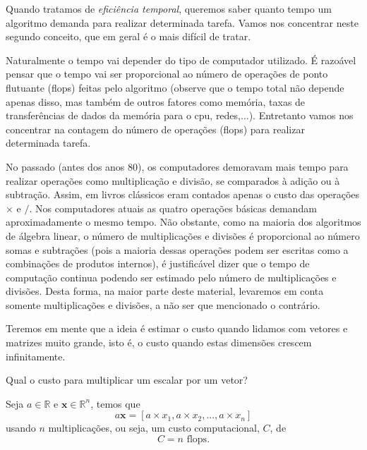 Quando tratamos de \emph{eficiência temporal}, queremos saber quanto tempo um algoritmo demanda para realizar determinada tarefa. Vamos nos concentrar neste segundo conceito, que em geral é o mais difícil de tratar.

Naturalmente o tempo vai depender do tipo de computador utilizado. É razoável pensar que o tempo vai ser proporcional ao número de operações de ponto flutuante (flops) feitas pelo algoritmo (observe que o tempo total não depende apenas disso, mas também de outros fatores como memória, taxas de transferências de dados da memória para o cpu, redes,...). Entretanto vamos nos concentrar na contagem do número de operações (flops) para realizar determinada tarefa.

No passado (antes dos anos 80), os computadores demoravam mais tempo para realizar operações como multiplicação e divisão, se comparados à adição ou à subtração. Assim, em livros clássicos eram contados apenas o custo das operações $\times$ e $/$. Nos computadores atuais as quatro operações básicas demandam aproximadamente o mesmo tempo. Não obstante, como na maioria dos algoritmos de álgebra linear, o número de multiplicações e divisões é proporcional ao número somas e subtrações (pois a maioria dessas operações podem ser escritas como a combinações de produtos internos), é justificável dizer que o tempo de computação continua podendo ser estimado pelo número de multiplicações e divisões. Desta forma, na maior parte deste material, levaremos em conta somente multiplicações e divisões, a não ser que mencionado o contrário.

Teremos em mente que a ideia é estimar o custo quando lidamos com vetores e matrizes muito grande, isto é, o custo quando estas dimensões crescem infinitamente.

\begin{ex}
Qual o custo para multiplicar um escalar por um vetor?
\end{ex}
\begin{sol}
Seja $a \in \mathbb{R}$ e $\pmb{x} \in \mathbb{R}^n$, temos que
\begin{equation}
  a \pmb{x} = [a\times x_1 , a\times x_2 , ... ,a\times x_n]
\end{equation}
usando $n$ multiplicações, ou seja, um custo computacional, $C$, de
\begin{equation}
  C = n \text{~flops}.
\end{equation}
\end{sol}

